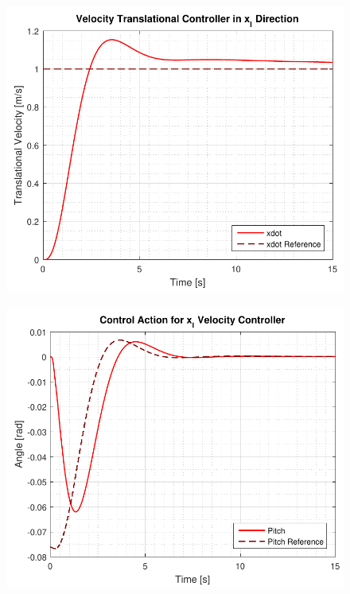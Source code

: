 \begin{minipage}{\linewidth}
    \begin{minipage}{0.5\linewidth}
        \begin{figure}[H]
            \includegraphics[scale=.5]{figures/velocityControllersXY}
            \centering			
            \label{fig:velocityControllersXY}
        \end{figure}
    \end{minipage}
    \hspace{0.03\linewidth}
    \begin{minipage}{0.5\linewidth}
        \begin{figure}[H]
            \includegraphics[scale=.5]{figures/velocityControllersXYAction}

\end{figure}
\end{minipage}
\end{minipage}
